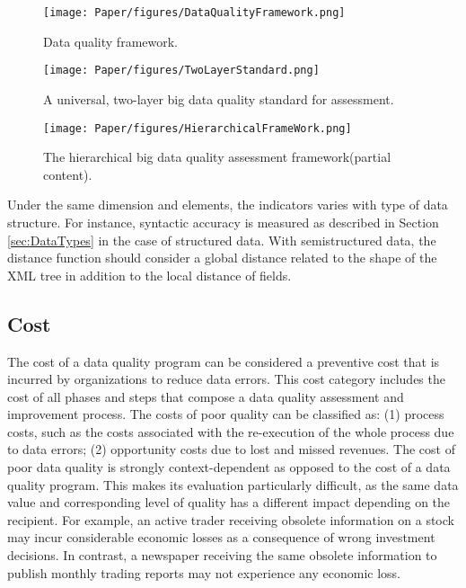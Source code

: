 \documentclass[pdftex,english,oribibl]{llncs}
\begin{document}
  \begin{figure}
    \centering
    \texttt{[image: Paper/figures/DataQualityFramework.png]}
    \caption{Data quality framework.}
    \label{fig:dataqualityframework}
  \end{figure}

  \begin{figure}
    \centering
    \texttt{[image: Paper/figures/TwoLayerStandard.png]}
    \caption{A universal, two-layer big data quality standard for assessment.}
    \label{fig:twolayerstandard}
  \end{figure}

\begin{figure}
    \centering
    \texttt{[image: Paper/figures/HierarchicalFrameWork.png]}
    \caption{The hierarchical big data quality assessment framework(partial content).}
    \label{fig:hierachicalframwork}
 \end{figure}
Under the same dimension and elements, the indicators varies with type of data structure.
 For instance, syntactic accuracy is measured as described in Section \ref{sec:DataTypes} in the case of structured data. With semistructured data, the distance function should consider a global distance related to the shape of the XML tree in addition to the local distance of fields.


\subsection{Cost}
The cost of a data quality program can be considered a preventive cost that is incurred by organizations to reduce data errors. This cost category includes the cost of all phases and steps that compose a data quality assessment and improvement process.
 The costs of poor quality can be classified as:
 (1) process costs, such as the costs associated with the re-execution of the whole process due to data errors;
 (2) opportunity costs due to lost and missed revenues.
 The cost of poor data quality is strongly context-dependent as opposed to the cost of a data quality program. This makes its evaluation particularly difficult, as the same data value and corresponding level of quality has a different impact depending on the recipient. For example, an active trader receiving obsolete information on a stock may incur considerable economic losses as a consequence of wrong investment decisions. In contrast, a newspaper receiving the same obsolete information to publish monthly trading reports may not experience any economic loss.
\end{document}
